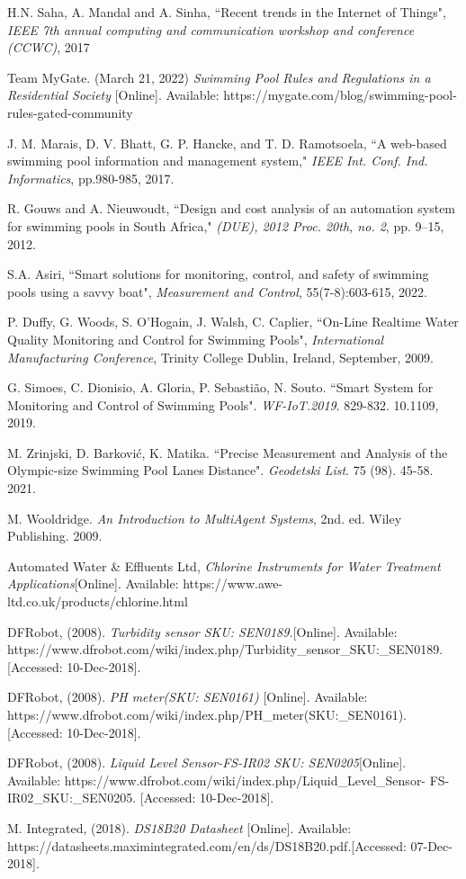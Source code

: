 \documentclass[12pt]{article}
\begin{document}
\begin{thebibliography}{}

H.N. Saha, A. Mandal and A. Sinha,
``Recent trends in the Internet of Things",
\textit{IEEE 7th annual computing and communication workshop and conference (CCWC)}, 2017

Team MyGate. (March 21, 2022)
\textit{Swimming Pool Rules and Regulations in a Residential Society}
[Online]. Available: https://mygate.com/blog/swimming-pool-rules-gated-community

J. M. Marais, D. V. Bhatt, G. P. Hancke, and T. D. Ramotsoela,
``A web-based swimming pool information and management system,"
\textit{IEEE Int. Conf. Ind. Informatics}, pp.980-985, 2017.

R. Gouws and A. Nieuwoudt,
``Design and cost analysis of an automation system for swimming pools in South Africa,"
\textit{(DUE), 2012 Proc. 20th, no. 2}, pp. 9–15, 2012.

S.A. Asiri,
``Smart solutions for monitoring, control, and safety of swimming pools using a savvy boat",
\textit{Measurement and Control}, 55(7-8):603-615, 2022.

P. Duffy, G. Woods, S. O'Hogain, J. Walsh, C. Caplier,
``On-Line Realtime Water Quality Monitoring and Control for Swimming Pools", \textit{International Manufacturing Conference}, 
Trinity College Dublin, Ireland, September, 2009.

G. Simoes, C. Dionisio, A. Gloria, P. Sebastião, N. Souto. 
``Smart System for Monitoring and Control of Swimming Pools". 
\textit{WF-IoT.2019}. 829-832. 10.1109, 2019. 

M. Zrinjski, D. Barković, K. Matika.
``Precise Measurement and Analysis of the Olympic-size Swimming Pool Lanes Distance". 
\textit{Geodetski List}. 75 (98). 45-58. 2021.

M. Wooldridge.  
\textit{An Introduction to MultiAgent Systems}, 2nd. ed. Wiley Publishing. 2009.

Automated Water \& Effluents Ltd,
\textit{Chlorine Instruments for Water Treatment Applications}[Online].
Available: https://www.awe-ltd.co.uk/products/chlorine.html

DFRobot, (2008).
\textit{Turbidity sensor SKU: SEN0189.}[Online]. Available: https://www.dfrobot.com/wiki/index.php/Turbidity\_sensor\_SKU:\_SEN0189. 
[Accessed: 10-Dec-2018].

DFRobot, (2008).
\textit{PH meter(SKU: SEN0161)} [Online]. Available: https://www.dfrobot.com/wiki/index.php/PH\_meter(SKU:\_SEN0161). [Accessed: 10-Dec-2018].

DFRobot, (2008).
\textit{Liquid Level Sensor-FS-IR02 SKU: SEN0205}[Online].
Available: https://www.dfrobot.com/wiki/index.php/Liquid\_Level\_Sensor- FS-IR02\_SKU:\_SEN0205. [Accessed: 10-Dec-2018].

M. Integrated, (2018).
\textit{DS18B20 Datasheet} [Online]. 
Available: https://datasheets.maximintegrated.com/en/ds/DS18B20.pdf.[Accessed: 07-Dec-2018].

\end{thebibliography}
\end{document}
